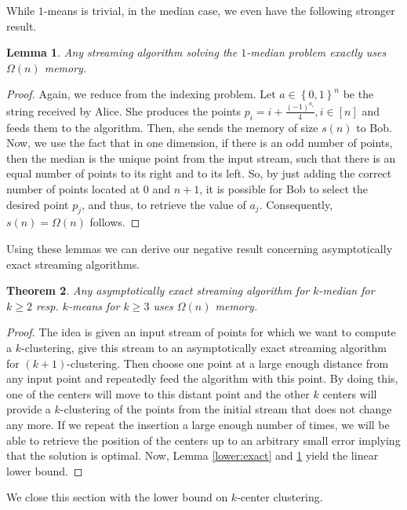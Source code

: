 \documentclass[a4paper,11pt,oneside,english,onecolumn]{article}
\newtheorem{theorem}{Theorem}
\newtheorem{lemma}[theorem]{Lemma}
\theoremstyle{definition}
\newcommand{\br}[1]{\left\{#1\right\}}                            \renewcommand{\Pr}[1]{\ensuremath{\mathbf{Pr}\left[#1\right]}}
\begin{document}
While $1$-means is trivial, in the median case, we even have the following stronger result.
\begin{lemma}
\label{lemma:1median}
Any streaming algorithm solving the $1$-median problem exactly uses $\Omega(n)$ memory.
\end{lemma}

\begin{proof}
Again, we reduce from the indexing problem. Let $a\in\br{0,1}^n$ be the string received by Alice. She produces the points $p_i = i + \frac{(-1)^{a_i}}{4}, i\in[n]$
and feeds them to the algorithm. Then, she sends the memory of size $s(n)$ to Bob. Now, we use the fact that in one dimension, if there is an odd number of points, then the median is the unique point from the input stream, such that there is an equal number of points to its right and to its left. So, by just adding the correct number of points located at $0$ and $n+1$, it is possible for Bob to select the desired point $p_j$, and thus, to retrieve the value of $a_j$. Consequently, $s(n)=\Omega(n)$ follows.
\end{proof}

Using these lemmas we can derive our negative result concerning asymptotically exact streaming algorithms.

\begin{theorem}
\label{lower:kmeanmed}
Any asymptotically exact streaming algorithm for $k$-median for $k \geq 2$ resp. $k$-means for $k \geq 3$ uses $\Omega(n)$ memory.
\end{theorem}
\begin{proof}
The idea is given an input stream of points for which we want to compute a $k$-clustering, give this stream to an asymptotically exact streaming algorithm for $(k+1)$-clustering. Then choose one point at a large enough distance from any input point and repeatedly feed the algorithm with this point. By doing this, one of the centers will move to this distant point and the other $k$ centers will provide a $k$-clustering of the points from the initial stream that does not change any more. If we repeat the insertion a large enough number of times, we will be able to retrieve the position of the centers up to an arbitrary small error implying that the solution is optimal. Now, Lemma \ref{lower:exact} and \ref{lemma:1median} yield the linear lower bound.
\end{proof}

We close this section with the lower bound on $k$-center clustering.
\end{document}

